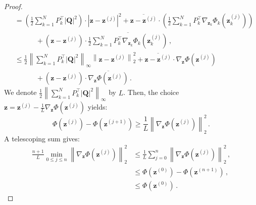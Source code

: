 \documentclass{article}
\numberwithin{equation}{section}
\begin{document}
\begin{proof}
\begin{equation*}
\begin{aligned}
        &= \left(\frac{1}{2} \sum_{k=1}^N  P_k^\top|\bm{Q}|^2\right)\cdot \left|\bm{z}-\bm{z}^{(j)}\right|^2 + \overline{\bm{z}-\bm{z}^{(j)}}\cdot\left(\frac{1}{2} \sum_{k=1}^N P_k^{\top}\nabla_{\bm{z}_k}\Phi_k\left(\bm{z}_k^{(j)}\right)\right)\\
        &\quad\quad\quad+\left(\bm{z}-\bm{z}^{(j)}\right)\cdot\overline{\frac{1}{2} \sum_{k=1}^N P_k^{\top}\nabla_{\bm{z}_k}\Phi_k\left(\bm{z}_k^{(j)}\right)} \,,\\
        &\leq \frac{1}{2}\left\|\sum_{k=1}^N  P_k^\top|\bm{Q}|^2\right\|_\infty\left\|\bm{z}-\bm{z}^{(j)}\right\|_2^2+\overline{\bm{z}-\bm{z}^{(j)}}\cdot \nabla_{\bm{z}}\Phi\left(\bm{z}^{(j)}\right)\\
        &\quad\quad\quad+\left(\bm{z}-\bm{z}^{(j)}\right)\cdot\overline{\nabla_{\bm{z}}\Phi\left(\bm{z}^{(j)}\right)}\,.
    \end{aligned} 
    \end{equation*}
    We denote $\frac{1}{2}\left\|\sum_{k=1}^N  P_k^\top|\bm{Q}|^2\right\|_\infty$ by $L$. Then, the choice $\bm{z}=\bm{z}^{(j)}-\frac{1}{L}\nabla_{\bm{z}}\Phi\left(\bm{z}^{(j)}\right)$ yields: 
    \begin{equation*}
        \Phi\left(\bm{z}^{(j)}\right)-\Phi\left(\bm{z}^{(j+1)}\right)\geq\frac{1}{L}\left\|\nabla_{\bm{z}}\Phi\left(\bm{z}^{(j)}\right)\right\|_2^2\,.
    \end{equation*}
    A telescoping sum gives:
    \begin{equation*}
    \begin{aligned}
        \frac{n+1}{L}\min_{0\leq j\leq n} \left\|\nabla_{\bm{z}}\Phi\left(\bm{z}^{(j)}\right)\right\|_2^2&\leq \frac{1}{L}\sum_{j=0}^n \left\|\nabla_{\bm{z}}\Phi\left(\bm{z}^{(j)}\right)\right\|_2^2\,,\\
        &\leq \Phi\left(\bm{z}^{(0)}\right)-\Phi\left(\bm{z}^{(n+1)}\right)\,,\\
        &\leq \Phi\left(\bm{z}^{(0)}\right)\,.
    \end{aligned}
    \end{equation*}
\end{proof}
\end{document}
